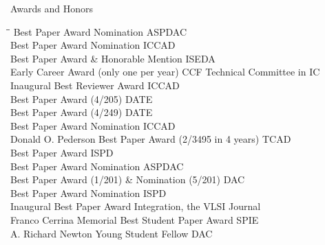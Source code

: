 
\begin{rSection}{Awards and Honors}
\begin{tabbing}
\hspace{3.8in}\= \hspace{2.6in}\= \kill
Best Paper Award Nomination \> ASPDAC  \\
Best Paper Award Nomination \> ICCAD  \\
Best Paper Award \& Honorable Mention \> ISEDA  \\
Early Career Award (only one per year) \> CCF Technical Committee in IC  \\
Inaugural Best Reviewer Award \> ICCAD  \\
Best Paper Award (4/205) \> DATE  \\
Best Paper Award (4/249) \> DATE  \\
Best Paper Award Nomination \> ICCAD  \\
Donald O. Pederson Best Paper Award (2/3495 in 4 years) \> TCAD  \\
Best Paper Award \> ISPD  \\
Best Paper Award Nomination \> ASPDAC  \\
Best Paper Award (1/201) \& Nomination (5/201) \> DAC  \\
Best Paper Award Nomination \> ISPD  \\
Inaugural Best Paper Award \> Integration, the VLSI Journal  \\
Franco Cerrina Memorial Best Student Paper Award \> SPIE  \\
A. Richard Newton Young Student Fellow \> DAC  \\
\end{tabbing}
\end{rSection}

